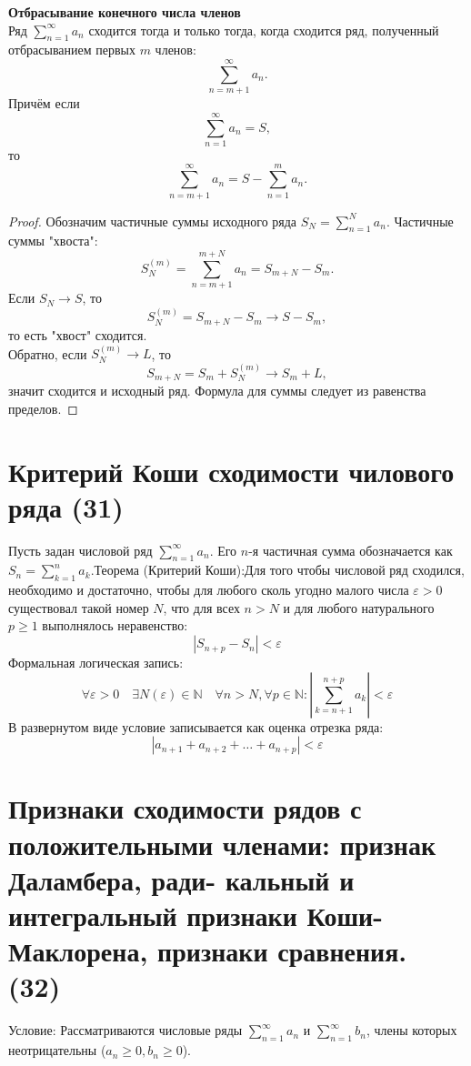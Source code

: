 \documentclass[14pt]{extreport}
\begin{document}
    \begin{theorem}
        \textbf{Отбрасывание конечного числа членов}\\
        Ряд $\sum_{n=1}^\infty a_n$ сходится тогда и только тогда, когда сходится ряд, полученный отбрасыванием первых $m$ членов:
        \[
        \sum_{n=m+1}^\infty a_n.
        \]
        Причём если
        \[
        \sum_{n=1}^\infty a_n = S,
        \]
        то
        \[
        \sum_{n=m+1}^\infty a_n = S - \sum_{n=1}^m a_n.
        \]
    \end{theorem}
    \begin{proof}
        Обозначим частичные суммы исходного ряда $S_N = \sum_{n=1}^N a_n$. Частичные суммы "хвоста":
        \[
        S_N^{(m)} = \sum_{n=m+1}^{m+N} a_n = S_{m+N} - S_m.
        \]
        Если $S_N \rightarrow S$, то
        \[
        S_N^{(m)} = S_{m+N} - S_m \rightarrow S - S_m,
        \]
        то есть "хвост" сходится.\\
        Обратно, если $S_N^{(m)} \rightarrow L$, то
        \[
        S_{m+N} = S_m + S_N^{(m)} \rightarrow S_m + L,
        \]
        значит сходится и исходный ряд. Формула для суммы следует из равенства пределов.
    \end{proof}


    \chapter{Критерий Коши сходимости чилового ряда (31)}
    \begin{definition}
    Пусть задан числовой ряд $\sum_{n=1}^{\infty} a_n$. Его $n$-я частичная сумма обозначается как $S_n = \sum_{k=1}^n a_k$.Теорема (Критерий Коши):Для того чтобы числовой ряд сходился, необходимо и достаточно, чтобы для любого сколь угодно малого числа $\varepsilon > 0$ существовал такой номер $N$, что для всех $n > N$ и для любого натурального $p \ge 1$ выполнялось неравенство:$$|S_{n+p} - S_n| < \varepsilon$$Формальная логическая запись:$$\forall \varepsilon > 0 \quad \exists N(\varepsilon) \in \mathbb{N} \quad \forall n > N, \forall p \in \mathbb{N} : \left| \sum_{k=n+1}^{n+p} a_k \right| < \varepsilon$$В развернутом виде условие записывается как оценка отрезка ряда:$$|a_{n+1} + a_{n+2} + \dots + a_{n+p}| < \varepsilon$$
    \end{definition}

    \chapter{Признаки сходимости рядов с положительными членами: признак Даламбера, ради-
кальный и интегральный признаки Коши-Маклорена, признаки сравнения. (32)}
    Условие: Рассматриваются числовые ряды $\sum_{n=1}^{\infty} a_n$ и $\sum_{n=1}^{\infty} b_n$, члены которых неотрицательны ($a_n \ge 0, b_n \ge 0$).
\end{document}
